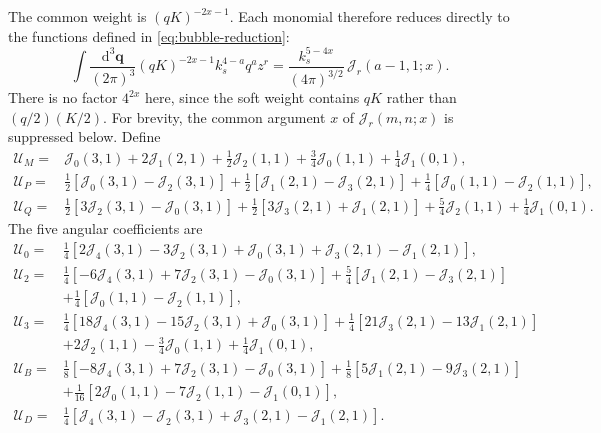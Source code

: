 \documentclass[a4paper,12pt]{article}
\newcommand{\mb}{\mathbf}
\newcommand{\di}{\mathrm d}
\begin{document}
The common weight is $(qK)^{-2x-1}$. Each monomial therefore
reduces directly to the functions defined in \eqref{eq:bubble-reduction}:
\begin{equation}
 \int\frac{\di^3\mb q}{(2\pi)^3}
 (qK)^{-2x-1}k_s^{4-a}q^a z^r
 =\frac{k_s^{5-4x}}{(4\pi)^{3/2}}\,
 \mathcal J_r(a-1,1;x).
 \label{eq:top-loop-J-map}
\end{equation}
There is no factor $4^{2x}$ here, since the soft weight contains
$qK$ rather than $(q/2)(K/2)$.
For brevity, the common argument $x$ of $\mathcal J_r(m,n;x)$
is suppressed below. Define
\begin{align}
 \mathcal U_M={}&\mathcal J_0(3,1)+2\mathcal J_1(2,1)
 +\frac12\mathcal J_2(1,1)+\frac34\mathcal J_0(1,1)
 +\frac14\mathcal J_1(0,1),\nonumber\\
 \mathcal U_P={}&\frac12[\mathcal J_0(3,1)-\mathcal J_2(3,1)]
 +\frac12[\mathcal J_1(2,1)-\mathcal J_3(2,1)]
 +\frac14[\mathcal J_0(1,1)-\mathcal J_2(1,1)],\nonumber\\
 \mathcal U_Q={}&\frac12[3\mathcal J_2(3,1)-\mathcal J_0(3,1)]
 +\frac12[3\mathcal J_3(2,1)+\mathcal J_1(2,1)]
 +\frac54\mathcal J_2(1,1)+\frac14\mathcal J_1(0,1).
 \label{eq:top-loop-J-isotropic}
\end{align}
The five angular coefficients are
\begin{align}
 \mathcal U_0={}&\frac14[2\mathcal J_4(3,1)-3\mathcal J_2(3,1)
 +\mathcal J_0(3,1)+\mathcal J_3(2,1)-\mathcal J_1(2,1)],\nonumber\\
 \mathcal U_2={}&\frac14[-6\mathcal J_4(3,1)+7\mathcal J_2(3,1)-\mathcal J_0(3,1)]
 +\frac54[\mathcal J_1(2,1)-\mathcal J_3(2,1)]\nonumber\\
 &+\frac14[\mathcal J_0(1,1)-\mathcal J_2(1,1)],\nonumber\\
 \mathcal U_3={}&\frac14[18\mathcal J_4(3,1)-15\mathcal J_2(3,1)+\mathcal J_0(3,1)]
 +\frac14[21\mathcal J_3(2,1)-13\mathcal J_1(2,1)]\nonumber\\
 &+2\mathcal J_2(1,1)-\frac34\mathcal J_0(1,1)+\frac14\mathcal J_1(0,1),\nonumber\\
 \mathcal U_B={}&\frac18[-8\mathcal J_4(3,1)+7\mathcal J_2(3,1)-\mathcal J_0(3,1)]
 +\frac18[5\mathcal J_1(2,1)-9\mathcal J_3(2,1)]\nonumber\\
 &+\frac1{16}[2\mathcal J_0(1,1)-7\mathcal J_2(1,1)-\mathcal J_1(0,1)],\nonumber\\
 \mathcal U_D={}&\frac14[\mathcal J_4(3,1)-\mathcal J_2(3,1)
 +\mathcal J_3(2,1)-\mathcal J_1(2,1)].
 \label{eq:top-loop-J-angular}
\end{align}
\end{document}
